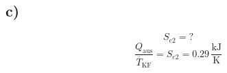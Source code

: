 

\subsection*{c)}
\[
S_{e2} = ?
\]
\[
\frac{Q_{\text{aus}}}{\overline{T}_{\text{KF}}} = S_{e2} = 0.29 \, \frac{\text{kJ}}{\text{K}}
\]